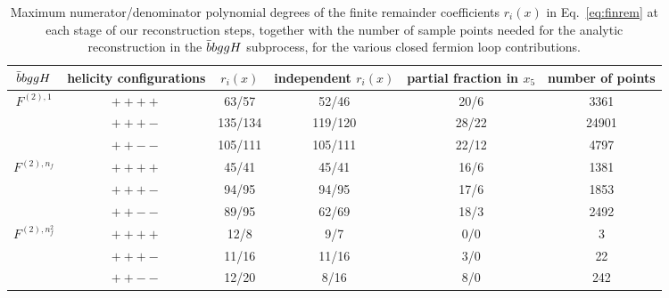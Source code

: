 \documentclass[main.tex]{subfiles}
\begin{document}
\renewcommand{\arraystretch}{1.5}
\begin{table}[t!]
\centering
\begin{tabularx}{0.95\textwidth}{|C{0.8}|C{1.2}|C{0.8}|C{1.0}|C{1.2}|C{1.0}|}
\hline
 $\bar{b}bggH$     & helicity configurations & $r_i(x)$ & independent $r_i(x)$ & partial fraction in $x_5$ & number of points \\
\hline
$F^{(2),1}$ & $++++$ & 63/57   & 52/46   & 20/6  & 3361 \\
            & $+++-$ & 135/134 & 119/120 & 28/22 & 24901 \\
            & $++--$ & 105/111 & 105/111 & 22/12 & 4797 \\
\hline
$F^{(2),n_f}$ & $++++$ & 45/41 & 45/41 & 16/6 & 1381 \\
              & $+++-$ & 94/95 & 94/95 & 17/6 & 1853 \\
              & $++--$ & 89/95 & 62/69 & 18/3 & 2492 \\
\hline
$F^{(2),n_f^2}$ & $++++$ & 12/8  & 9/7   & 0/0 & 3 \\
                & $+++-$ & 11/16 & 11/16 & 3/0 & 22 \\
                & $++--$ & 12/20 & 8/16  & 8/0 & 242 \\
\hline
\end{tabularx}
\caption{\label{tab:degrees2g2bH} Maximum numerator/denominator polynomial degrees of the finite remainder coefficients $r_i(x)$ in Eq.~\eqref{eq:finrem} 
at each stage of our reconstruction steps, together with the number of sample points needed for the analytic reconstruction in the $\bar{b}bggH$ subprocess, for the various closed fermion loop contributions.}
\end{table}
\end{document}
